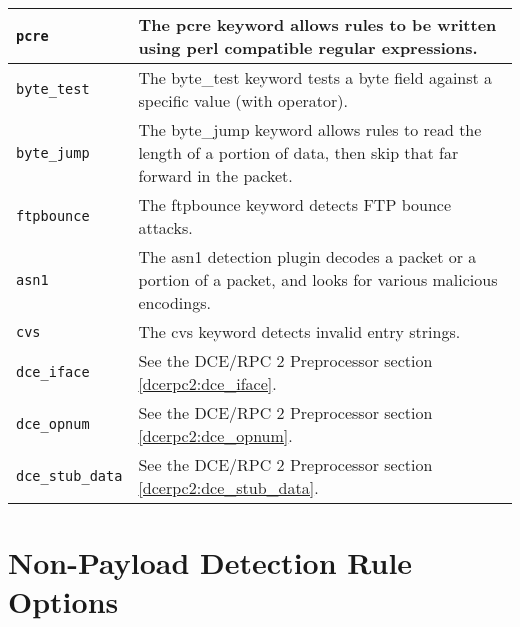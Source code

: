 \documentclass[english]{report}
\begin{document}
\begin{center}
\begin{longtable}[h]{| p{1in} | p{4.5in} |}
\hline
\texttt{pcre} &

The pcre keyword allows rules to be written using perl compatible regular
expressions. \\

\hline
\texttt{byte\_test} &

The byte\_test keyword tests a byte field against a specific value (with
operator). \\

\hline
\texttt{byte\_jump} &

The byte\_jump keyword allows rules to read the length of a portion of data,
then skip that far forward in the packet. \\

\hline
\texttt{ftpbounce} &

The ftpbounce keyword detects FTP bounce attacks. \\


\hline
\texttt{asn1} &

The asn1 detection plugin decodes a packet or a portion of a packet, and looks
for various malicious encodings. \\

\hline
\texttt{cvs} &

The cvs keyword detects invalid entry strings. \\

\hline
\texttt{dce\_iface} &

See the DCE/RPC 2 Preprocessor section \ref{dcerpc2:dce_iface}. \\

\hline
\texttt{dce\_opnum} &

See the DCE/RPC 2 Preprocessor section \ref{dcerpc2:dce_opnum}. \\

\hline
\texttt{dce\_stub\_data} &

See the DCE/RPC 2 Preprocessor section \ref{dcerpc2:dce_stub_data}. \\

\hline
\end{longtable}
\end{center}

\section{Non-Payload Detection Rule Options}
\end{document}
